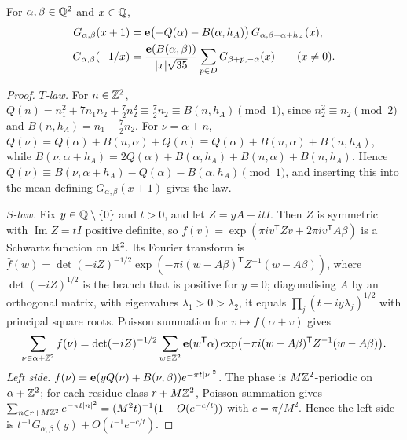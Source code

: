 \begin{theorem}\label{thm:STlaw}
For $\alpha,\beta\in\mathbb{Q}^2$ and $x\in\mathbb{Q}$,
\begin{align*}
G_{\alpha,\beta}(x+1)&=\mathbf{e}\bigl(-Q(\alpha)-B(\alpha,h_A)\bigr)\,G_{\alpha,\beta+\alpha+h_A}(x),\\
G_{\alpha,\beta}(-1/x)&=\frac{\mathbf{e}(B(\alpha,\beta))}{|x|\sqrt{35}}\sum_{p\in D}G_{\beta+p,-\alpha}(x)\qquad(x\ne0).
\end{align*}
\end{theorem}
\begin{proof}
\emph{$T$-law.} For $n\in\mathbb{Z}^2$, $Q(n)=n_1^2+7n_1n_2+\tfrac72n_2^2\equiv\tfrac72n_2\equiv B(n,h_A)\pmod1$, since $n_2^2\equiv n_2\pmod 2$ and
$B(n,h_A)=n_1+\tfrac72n_2$. For $\nu=\alpha+n$,
$Q(\nu)=Q(\alpha)+B(n,\alpha)+Q(n)\equiv Q(\alpha)+B(n,\alpha)+B(n,h_A)$, while
$B(\nu,\alpha+h_A)=2Q(\alpha)+B(\alpha,h_A)+B(n,\alpha)+B(n,h_A)$. Hence
$Q(\nu)\equiv B(\nu,\alpha+h_A)-Q(\alpha)-B(\alpha,h_A)\pmod 1$, and inserting this into the mean defining $G_{\alpha,\beta}(x+1)$ gives the law.

\emph{$S$-law.} Fix $y\in\mathbb{Q}\setminus\{0\}$ and $t>0$, and let $Z=yA+itI$. Then $Z$ is symmetric with $\operatorname{Im}Z=tI$ positive definite, so
$f(v)=\exp(\pi i v^{\mathsf T}Zv+2\pi iv^{\mathsf T}A\beta)$ is a Schwartz function on $\mathbb{R}^2$. Its Fourier transform is
$\hat f(w)=\det(-iZ)^{-1/2}\exp(-\pi i(w-A\beta)^{\mathsf T}Z^{-1}(w-A\beta))$, where $\det(-iZ)^{1/2}$ is the branch that is positive for
$y=0$; diagonalising $A$ by an orthogonal matrix, with eigenvalues $\lambda_1>0>\lambda_2$, it equals
$\prod_j(t-iy\lambda_j)^{1/2}$ with principal square roots. Poisson summation for $v\mapsto f(\alpha+v)$ gives
\begin{equation}\label{eq:poisson}
\sum_{\nu\in\alpha+\mathbb{Z}^2}f(\nu)=\det(-iZ)^{-1/2}\sum_{w\in\mathbb{Z}^2}\mathbf{e}(w^{\mathsf T}\alpha)\exp\bigl(-\pi i(w-A\beta)^{\mathsf T}Z^{-1}(w-A\beta)\bigr).
\end{equation}
\emph{Left side.} $f(\nu)=\mathbf{e}(yQ(\nu)+B(\nu,\beta))e^{-\pi t|\nu|^2}$. The phase is $M\mathbb{Z}^2$-periodic on $\alpha+\mathbb{Z}^2$; for each residue class
$r+M\mathbb{Z}^2$, Poisson summation gives $\sum_{n\in r+M\mathbb{Z}^2}e^{-\pi t|n|^2}=(M^2t)^{-1}(1+O(e^{-c/t}))$ with $c=\pi/M^2$. Hence the left side is
$t^{-1}G_{\alpha,\beta}(y)+O(t^{-1}e^{-c/t})$.


\end{proof}
